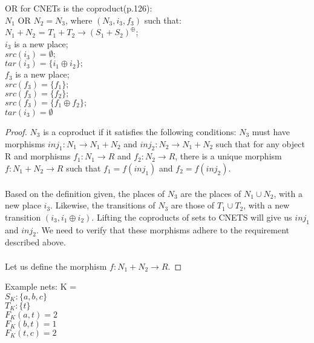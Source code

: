 OR for CNETs is the coproduct(p.126):\\
$N_1$ OR $N_2 = N_3$, where $(N_3,  i_3, f_3)$ such that:\\
$N_1 + N_2$ = $T_1 + T_2 \rightarrow (S_1 + S_2)^\oplus$;\\
$i_3$ is a new place;\\
$src(i_3) = \emptyset;$\\
$tar(i_3) =\{i_1 \oplus i_2\};$\\
$f_3$ is a new place;\\
$src(f_3) = \{f_1\};$\\
$src(f_3) = \{f_2\};$\\
$src(f_3) = \{f_1 \oplus f_2\};$\\
$tar(i_3) =\emptyset$\bigskip\\
\begin {proof}
$N_3$ is a coproduct if it satisfies the following conditions: $N_3$ must have morphisms $inj_1: N_1 \rightarrow N_1 + N_2$ and $inj_2: N_2 \rightarrow N_1 + N_2$ such that for any object R and morphisms $f_1: N_1\rightarrow R$ and $f_2: N_2\rightarrow R$, there is a unique morphism $f: N_1 + N_2 \rightarrow R$ such that $f_1 = f(inj_1)$ and $f_2 = f(inj_2)$.\\
\bigskip\\
Based on the definition given, the places of $N_3$ are the places of $N_1 \cup N_2$, with a new place $i_3$. Likewise, the transitions of $N_3$ are those of $T_1 \cup T_2$, with a new transition $(i_3, i_1 \oplus i_2)$. Lifting the coproducts of sets to CNETS will give us $inj_1$ and $inj_2$. We need to verify that these morphisms adhere to the requirement described above.\\
\bigskip\\
Let us define the morphism $f: N_1 +  N_2 \rightarrow R$. 
\end{proof}
\newpage
Example nets:
%
K = \\
$S_K :\{ a, b, c\}$\\
$T_K :\{t\}$\\  
$F_K (a, t) = 2$\\
$F_K (b, t) = 1$\\
$F_K (t, c) = 2$\\

